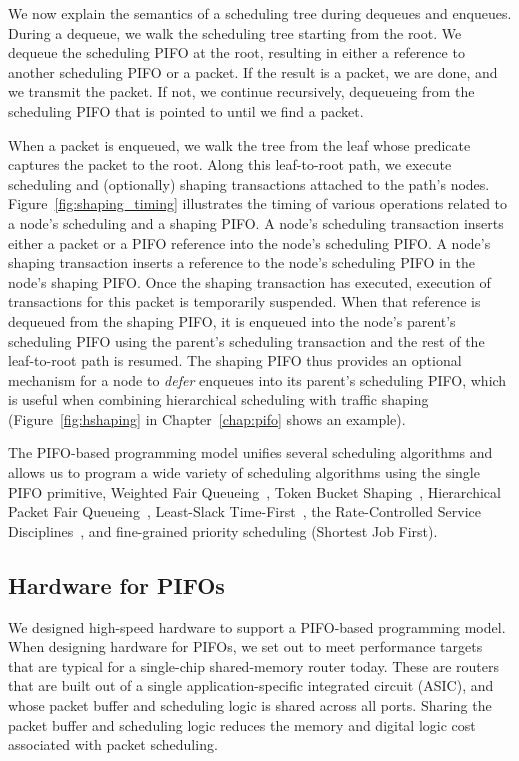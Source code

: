 We now explain the semantics of a scheduling tree during dequeues and enqueues.
During a dequeue, we walk the scheduling tree starting from the root. We
dequeue the scheduling PIFO at the root, resulting in either a reference to
another scheduling PIFO or a packet. If the result is a packet, we are done,
and we transmit the packet. If not, we continue recursively, dequeueing from
the scheduling PIFO that is pointed to until we find a packet.

When a packet is enqueued, we walk the tree from the leaf whose predicate
captures the packet to the root. Along this leaf-to-root path, we execute
scheduling and (optionally) shaping transactions attached to the path's nodes.
Figure~\ref{fig:shaping_timing} illustrates the timing of various operations
related to a node's scheduling and a shaping PIFO. A node's scheduling
transaction inserts either a packet or a PIFO reference into the node's
scheduling PIFO. A node's shaping transaction inserts a reference to the node's
scheduling PIFO in the node's shaping PIFO. Once the shaping transaction has
executed, execution of transactions for this packet is temporarily suspended.
When that reference is dequeued from the shaping PIFO, it is enqueued into the
node's parent's scheduling PIFO using the parent's scheduling transaction and
the rest of the leaf-to-root path is resumed.  The shaping PIFO thus provides
an optional mechanism for a node to {\em defer} enqueues into its parent's
scheduling PIFO, which is useful when combining hierarchical scheduling with
traffic shaping (Figure~\ref{fig:hshaping} in Chapter~\ref{chap:pifo} shows an
example).

The PIFO-based programming model unifies several scheduling algorithms and
allows us to program a wide variety of scheduling algorithms using the single
PIFO primitive, \eg Weighted Fair Queueing~\cite{wfq}, Token Bucket
Shaping~\cite{tbf}, Hierarchical Packet Fair Queueing~\cite{hpfq}, Least-Slack
Time-First~\cite{lstf}, the Rate-Controlled Service Disciplines~\cite{rcsd},
and fine-grained priority scheduling (\eg Shortest Job First).

\subsection{Hardware for PIFOs} We designed high-speed hardware to support a
PIFO-based programming model. When designing hardware for PIFOs, we set out to
meet performance targets that are typical for a single-chip shared-memory
router today. These are routers that are built out of a single
application-specific integrated circuit (ASIC), and whose packet buffer and
scheduling logic is shared across all ports. Sharing the packet buffer and
scheduling logic reduces the memory and digital logic cost associated with
packet scheduling.

